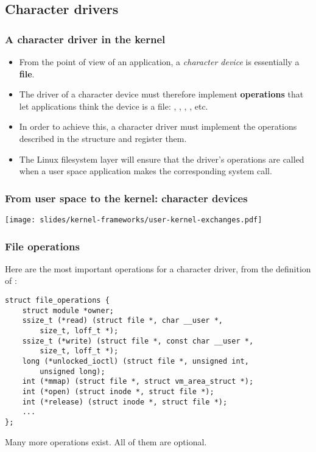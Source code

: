 \subsection{Character drivers}

\begin{frame}
  \frametitle{A character driver in the kernel}
  \begin{itemize}
  \item From the point of view of an application, a {\em character
      device} is essentially a {\bf file}.
  \item The driver of a character device must therefore implement {\bf
      operations} that let applications think the device is a file:
    , , , , etc.
  \item In order to achieve this, a character driver must implement
    the operations described in the 
    structure and register them.
  \item The Linux filesystem layer will ensure that the driver's
    operations are called when a user space application makes the
    corresponding system call.
  \end{itemize}
\end{frame}

\begin{frame}
  \frametitle{From user space to the kernel: character devices}
  \begin{center}
    \texttt{[image: slides/kernel-frameworks/user-kernel-exchanges.pdf]}
  \end{center}
\end{frame}

\begin{frame}[fragile]
  \frametitle{File operations}
  Here are the most important operations for a character
  driver, from the definition of :
\begin{verbatim}
struct file_operations {
    struct module *owner;
    ssize_t (*read) (struct file *, char __user *,
        size_t, loff_t *);
    ssize_t (*write) (struct file *, const char __user *,
        size_t, loff_t *);
    long (*unlocked_ioctl) (struct file *, unsigned int,
        unsigned long);
    int (*mmap) (struct file *, struct vm_area_struct *);
    int (*open) (struct inode *, struct file *);
    int (*release) (struct inode *, struct file *);
    ...
};
\end{verbatim}
Many more operations exist. All of them are optional.
\end{frame}

